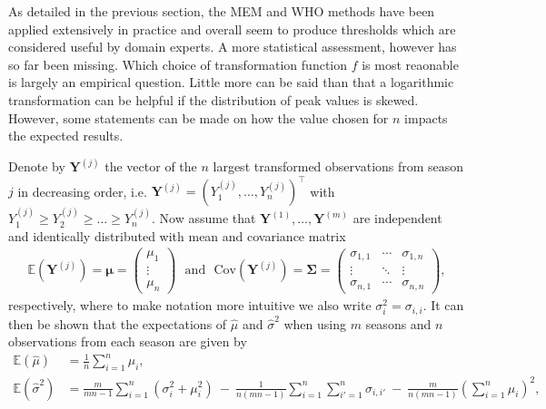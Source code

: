 \documentclass{article}
\begin{document}
As detailed in the previous section, the MEM and WHO methods have been applied extensively in practice and overall seem to produce thresholds which are considered useful by domain experts. A more statistical assessment, however has so far been missing. Which choice of transformation function $f$ is most reaonable is largely an empirical question. Little more can be said than that a logarithmic transformation can be helpful if the distribution of peak values is skewed. However, some statements can be made on how the value chosen for $n$ impacts the expected results.

Denote by $\mathbf{Y}^{(j)}$ the vector of the $n$ largest transformed observations from season $j$ in decreasing order, i.e. $\mathbf{Y}^{(j)} = (Y^{(j)}_1, \dots, Y^{(j)}_n)^\top$ with $Y^{(j)}_1 \geq Y^{(j)}_2 \geq \dots \geq Y^{(j)}_n$. Now assume that $\mathbf{Y}^{(1)}, \dots, \mathbf{Y}^{(m)}$ are independent and identically distributed with mean and covariance matrix
\begin{align}
\mathbb{E}\left(\mathbf{Y}^{(j)}\right) = \boldsymbol{\mu} = \left(\begin{array}{c}
\mu_1\\
\vdots\\
\mu_n
\end{array}\right) \ \ \ \text{and} \ \ \ \text{Cov}\left(\mathbf{Y}^{(j)}\right) = \boldsymbol{\Sigma} =
\left(\begin{array}{ccc}
\sigma_{1, 1} & \cdots & \sigma_{1, n}\\
\vdots & \ddots &\vdots\\
\sigma_{n, 1} & \cdots & \sigma_{n, n}
\end{array}\right),
\end{align}
respectively, where to make notation more intuitive we also write $\sigma^2_i = \sigma_{i, i}$. It can then be shown that the expectations of $\hat\mu$ and $\hat{\sigma}^2$ when using $m$ seasons and $n$ observations from each season are given by
\begin{align}
\mathbb{E}(\hat{\mu}) & = \frac{1}{n} \sum_{i = 1}^n \mu_i,
\label{eq:expectation_mu}\\
\mathbb{E}(\hat{\sigma}^2) & = \frac{m}{mn - 1} \sum_{i = 1}^n (\sigma_{i}^2 + \mu_i^2) \ - \ \frac{1}{n(mn - 1)} \sum_{i = 1}^n \sum_{i' = 1}^n \sigma_{i,i'} \ - \ \frac{m}{n(mn - 1)}\left(\sum_{i = 1}^n \mu_i\right)^2,
\label{eq:expectation_sigma2}
\end{align}
\end{document}
